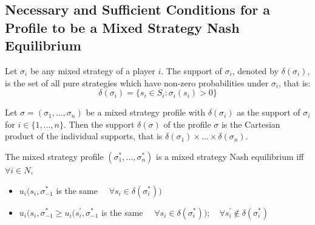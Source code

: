 \subsection{Necessary and Sufficient Conditions for a Profile to be a Mixed Strategy Nash Equilibrium}
\begin{defn}
	Let $\sigma_i$ be any mixed strategy of a player $i$.
	The support of $\sigma_i$, denoted by $\delta(\sigma_i)$, is the set of all pure strategies which have non-zero probabilities under $\sigma_i$, that is:
	\[\delta(\sigma_i)=\{s_i\in S_i:\sigma_i(s_i)>0\}\]
\end{defn}
\begin{defn}
	Let $\sigma = (\sigma_1,\ldots,\sigma_n)$ be a mixed strategy profile with $\delta(\sigma_i)$ as the support of $\sigma_i$ for $i\in \{1,\ldots,n\}$.
	Then the support $\delta(\sigma)$ of the profile $\sigma$ is the Cartesian product of the individual supports, that is $\delta(\sigma_1) \times\ldots\times \delta(\sigma_n)$.
\end{defn}
\begin{theorem}
	The mixed strategy profile $(\sigma_1^*,\ldots,\sigma_n^*)$ is a mixed strategy Nash equilibrium iff $\forall i \in N$,
	\begin{itemize}
		\item $u_i(s_i,\sigma^*_{-1}$ is the same $\quad \forall s_i\in \delta(\sigma_i^*))$
		\item $u_i(s_i,\sigma^*_{-1} \geq u_i(s_i^\prime,\sigma^*_{-1}$ is the same $\quad \forall s_i\in \delta(\sigma_i^*));\quad \forall s_i^\prime \notin \delta(\sigma_i^*)$
	\end{itemize}
\end{theorem}
